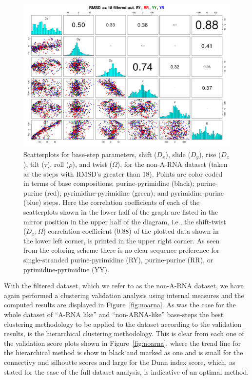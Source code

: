 \begin{figure}
\centering
\includegraphics[angle=90, scale=0.48]{Chapter2/noarna_step.png}
\caption{Scatterplots for base-step parameters, shift ($D_{x}$), slide
($D_{y}$),  rise ($D_{z}$),  tilt ($\tau$),  roll ($\rho$),  and twist
($\Omega$), for the non-A-RNA dataset  (taken as the steps with RMSD's
greater  than  18).    Points  are  color  coded  in   terms  of  base
compositions;   purine-pyrimidine    (black);   purine-purine   (red);
pyrimidine-pyrimidine    (green);    and   pyrimidine-purine    (blue)
steps. Here  the correlation coefficients of each  of the scatterplots
shown in the lower half of the graph are listed in the mirror position
in  the upper  half of  the  diagram, i.e.,  the shift-twist  ($D_{x},
\Omega$) correlation  coefficient (0.88) of the plotted  data shown in
the lower left corner, is printed  in the upper right corner.  As seen
from the  coloring scheme  there is no  clear sequence  preference for
single-stranded   purine-pyrimidine  (RY),   purine-purine   (RR),  or
pyrimidine-pyrimidine (YY).}
\label{fig:pairsnoarna}
\end{figure}

With the filtered dataset, which we refer to as the non-A-RNA dataset,
we  have  again  performed  a  clustering  validation  analysis  using
internal  measures   and  the   computed  results  are   displayed  in
Figure~\ref{fig:noarna}.  As was the  case for  the whole  dataset of
``A-RNA  like'' and ``non-ARNA-like''  base-steps the  best clustering
methodology to be  applied to the dataset according  to the validation
results, is  the hierarchical  clustering methodology. This  is clear
from   each   one   of   the   validation   score   plots   shown   in
Figure~\ref{fig:noarna},  where the  trend line  for  the hierarchical
method  is show in  black and  marked as  one and  is small  for the
connectivy and  silhoutte scores and  large for the Dunn  index score,
which,  as  stated for  the  case of  the  full  dataset analysis,  is
indicative of an optimal method.

